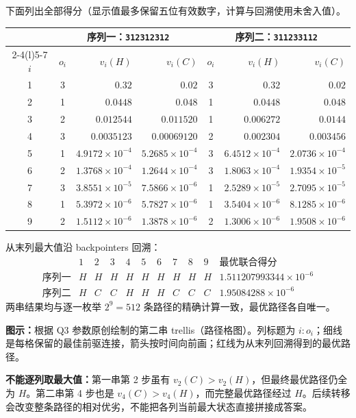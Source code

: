 \begin{checkedsolution}
下面列出全部得分（显示值最多保留五位有效数字，计算与回溯使用未舍入值）。
\begin{center}
\small
\setlength{\tabcolsep}{5pt}
\begin{tabular}{@{}ccrrcrr@{}}
\toprule
&\multicolumn{3}{c}{序列一：\texttt{312312312}}&\multicolumn{3}{c}{序列二：\texttt{311233112}}\\
\cmidrule(lr){2-4}\cmidrule(l){5-7}
$i$&$o_i$&$v_i(H)$&$v_i(C)$&$o_i$&$v_i(H)$&$v_i(C)$\\
\midrule
1&3&$0.32$&$0.02$&3&$0.32$&$0.02$\\
2&1&$0.0448$&$0.048$&1&$0.0448$&$0.048$\\
3&2&$0.012544$&$0.011520$&1&$0.006272$&$0.0144$\\
4&3&$0.0035123$&$0.00069120$&2&$0.002304$&$0.003456$\\
5&1&$4.9172\!\times\!10^{-4}$&$5.2685\!\times\!10^{-4}$&3&$6.4512\!\times\!10^{-4}$&$2.0736\!\times\!10^{-4}$\\
6&2&$1.3768\!\times\!10^{-4}$&$1.2644\!\times\!10^{-4}$&3&$1.8063\!\times\!10^{-4}$&$1.9354\!\times\!10^{-5}$\\
7&3&$3.8551\!\times\!10^{-5}$&$7.5866\!\times\!10^{-6}$&1&$2.5289\!\times\!10^{-5}$&$2.7095\!\times\!10^{-5}$\\
8&1&$5.3972\!\times\!10^{-6}$&$5.7827\!\times\!10^{-6}$&1&$3.5404\!\times\!10^{-6}$&$8.1285\!\times\!10^{-6}$\\
9&2&$1.5112\!\times\!10^{-6}$&$1.3878\!\times\!10^{-6}$&2&$1.3006\!\times\!10^{-6}$&$1.9508\!\times\!10^{-6}$\\
\bottomrule
\end{tabular}
\end{center}
从末列最大值沿 backpointers 回溯：
\[
\begin{array}{c|ccccccccc|l}
 &1&2&3&4&5&6&7&8&9&\text{最优联合得分}\\\hline
\text{序列一}&H&H&H&H&H&H&H&H&H&1.511207993344\times10^{-6}\\
\text{序列二}&H&C&C&H&H&H&C&C&C&1.95084288\times10^{-6}
\end{array}
\]
两串结果均与逐一枚举 $2^9=512$ 条路径的精确计算一致，最优路径各自唯一。

\begin{center}

\end{center}
\textbf{图示：}根据 Q3 参数原创绘制的第二串 trellis（路径格图）。列标题为 $i:o_i$；细线是每格保留的最佳前驱连接，箭头按时间向前画；红线为从末列回溯得到的最优路径。

\textbf{不能逐列取最大值：}第一串第 2 步虽有 $v_2(C)>v_2(H)$，但最终最优路径仍全为 $H$。第二串第 4 步也是 $v_4(C)>v_4(H)$，而完整最优路径经过 $H$。后续转移会改变整条路径的相对优劣，不能把各列当前最大状态直接拼接成答案。
\end{checkedsolution}

